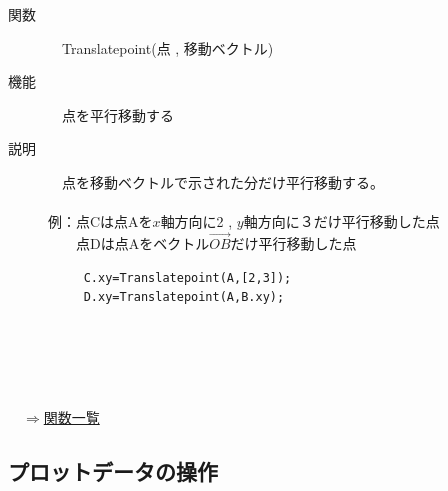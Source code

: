 \documentclass[papersize,a4paper,12pt,uplatex]{jsarticle}
\begin{document}
\begin{description}
\hypertarget{translatepoint}{}
\item[関数]　Translatepoint(点 , 移動ベクトル)
\item[機能]　点を平行移動する
\item[説明]　点を移動ベクトルで示された分だけ平行移動する。\\
\\
例：点Cは点Aを$x$軸方向に2 , $y$軸方向に３だけ平行移動した点\\
　　点Dは点Aをベクトル$\overrightarrow{OB} $だけ平行移動した点
\begin{verbatim}
　　　C.xy=Translatepoint(A,[2,3]);
　　　D.xy=Translatepoint(A,B.xy);
\end{verbatim}
　\\
　　　　　
\end{description}
　\\

\begin{flushright}　\hyperlink{functionlist}{$\Rightarrow$関数一覧}\end{flushright}
\newpage
\subsection{プロットデータの操作}

\end{document}
